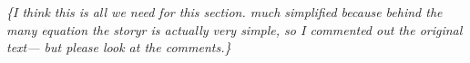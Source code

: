 \documentclass[letterpaper, 10 pt, conference]{ieeeconf}  %
\newcommand{\anote}[1]{{\leavevmode\smaller\itshape\color{red}\{#1\}}}
\begin{document}







\anote{I think this is all we need for this section. much simplified because behind the many equation the storyr is actually very simple, so I commented out the original text--- but please look at the comments.}
%
\end{document}
